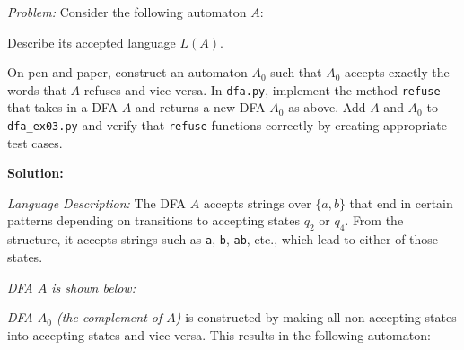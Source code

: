 \documentclass{article}
\theoremstyle{theorem}
\theoremstyle{definition}
\theoremstyle{remark}
\begin{document}
\textit{Problem:}  
Consider the following automaton $A$:

Describe its accepted language $L(A)$.

On pen and paper, construct an automaton $A_0$ such that $A_0$ accepts exactly the words that $A$ refuses and vice versa.  
In \texttt{dfa.py}, implement the method \texttt{refuse} that takes in a DFA $A$ and returns a new DFA $A_0$ as above.  
Add $A$ and $A_0$ to \texttt{dfa\_ex03.py} and verify that \texttt{refuse} functions correctly by creating appropriate test cases.

\vspace{0.5em}

\textbf{Solution:}

\textit{Language Description:}  
The DFA $A$ accepts strings over $\{a, b\}$ that end in certain patterns depending on transitions to accepting states $q_2$ or $q_4$. From the structure, it accepts strings such as \texttt{a}, \texttt{b}, \texttt{ab}, etc., which lead to either of those states.

\vspace{0.5em}
\textit{DFA $A$ is shown below:}

\begin{center}
\end{center}

\textit{DFA $A_0$ (the complement of $A$)} is constructed by making all non-accepting states into accepting states and vice versa. This results in the following automaton:

\begin{center}
\end{center}
\end{document}
